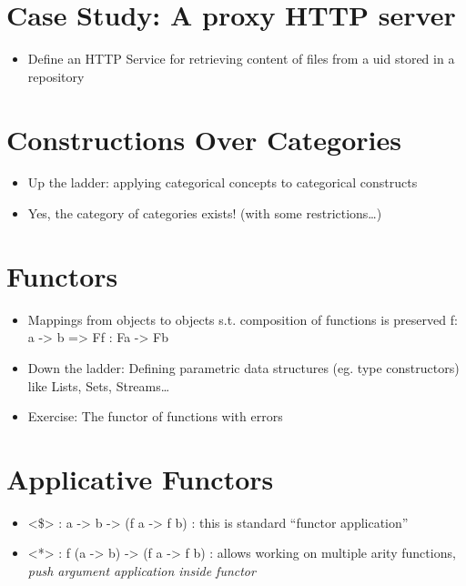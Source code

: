 \documentclass{article}
\begin{document}
\section{Case Study: A proxy HTTP server}

\begin{itemize}
\item
  Define an HTTP Service for retrieving content of files from a uid
  stored in a repository
\end{itemize}
\section{Constructions Over Categories}

\begin{itemize}
\item
  Up the ladder: applying categorical concepts to categorical constructs
\item
  Yes, the category of categories exists! (with some
  restrictions\ldots{})
\end{itemize}
\section{Functors}

\begin{itemize}
\item
  Mappings from objects to objects s.t. composition of functions is
  preserved f: a -\textgreater{} b =\textgreater{} Ff : Fa
  -\textgreater{} Fb
\item
  Down the ladder: Defining parametric data structures (eg. type
  constructors) like Lists, Sets, Streams\ldots{}
\item
  Exercise: The functor of functions with errors
\end{itemize}
\section{Applicative Functors}

\begin{itemize}
\item
  \textless{}\$\textgreater{} : a -\textgreater{} b -\textgreater{} (f a
  -\textgreater{} f b) : this is standard ``functor application''
\item
  \textless{}*\textgreater{} : f (a -\textgreater{} b) -\textgreater{}
  (f a -\textgreater{} f b) : allows working on multiple arity
  functions, \emph{push argument application inside functor}
\end{itemize}
\end{document}
